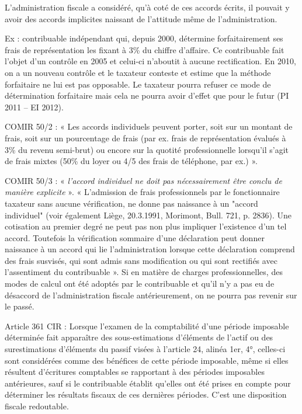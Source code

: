 \documentclass{book}
\begin{document}
L’administration fiscale a considéré, qu’à coté de ces accords écrits, il pouvait y avoir des accords implicites naissant de l’attitude même de l’administration. 

Ex : contribuable indépendant qui, depuis 2000, détermine forfaitairement ses frais de représentation les fixant à 3\% du chiffre d’affaire. Ce contribuable fait l’objet d’un contrôle en 2005 et celui-ci n’aboutit à aucune rectification. En 2010, on a un nouveau contrôle et le taxateur conteste et estime que la méthode forfaitaire ne lui est pas opposable. Le taxateur pourra refuser ce mode de détermination forfaitaire mais cela ne pourra avoir d’effet que pour le futur (PI 2011 – EI 2012). 

COMIR 50/2 : « Les accords individuels peuvent porter, soit sur un montant de frais, soit sur un pourcentage de frais (par ex. frais de représentation évalués à 3\% du revenu semi-brut) ou encore sur la quotité professionnelle lorsqu'il s'agit de frais mixtes (50\% du loyer ou 4/5 des frais de téléphone, par ex.) ». 

COMIR 50/3 : « \textit{l'accord individuel ne doit pas nécessairement être conclu de manière explicite} ». « L'admission de frais professionnels par le fonctionnaire taxateur sans aucune vérification, ne donne pas naissance à un "accord individuel" (voir également Liège, 20.3.1991, Morimont, Bull. 721, p. 2836). Une cotisation au premier degré ne peut pas non plus impliquer l'existence d'un tel accord. Toutefois la vérification sommaire d'une déclaration peut donner naissance à un accord qui lie l'administration lorsque cette déclaration comprend des frais susvisés, qui sont admis sans modification ou qui sont rectifiés avec l'assentiment du contribuable ».
Si en matière de charges professionnelles, des modes de calcul ont été adoptés par le contribuable et qu’il n’y a pas eu de désaccord de l’administration fiscale antérieurement, on ne pourra pas revenir sur le passé. 

Article 361 CIR : Lorsque l'examen de la comptabilité d'une période imposable déterminée fait apparaître des sous-estimations d'éléments de l'actif ou des surestimations d'éléments du passif visées à l'article 24, alinéa 1er, 4°, celles-ci sont considérées comme des bénéfices de cette période imposable, même si elles résultent d'écritures comptables se rapportant à des périodes imposables antérieures, sauf si le contribuable établit qu'elles ont été prises en compte pour déterminer les résultats fiscaux de ces dernières périodes.
C’est une disposition fiscale redoutable.
\end{document}
